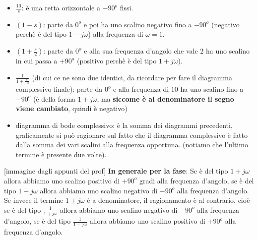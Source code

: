 \begin{itemize}
    \item $\frac{10}{s}$: è una retta orizzontale a $-90^o$ fissi.
    \item $(1-s)$: parte da $0^o$ e poi ha uno scalino negativo fino a $-90^o$ (negativo perchè è del tipo $1-j \omega$) alla frequenza di $\omega=1$.
    \item $(1+\frac{s}{2})$:  parte da $0^o$ e alla sua frequenza d'angolo che vale $2$ ha uno scalino in cui passa a $+ 90^o$ (positivo perchè è del tipo $1+j \omega$).
    \item $\frac{1}{1 + \frac{s}{10}}$ (di cui ce ne sono due identici, da ricordare per fare il diagramma complessivo finale): parte da $0^o$ e alla frequenza di $10$ ha uno scalino fino a $-90^o$ (è della forma $1 + j \omega$, ma \textbf{siccome è al denominatore il segno viene cambiato}, quindi è negativo)
    \item diagramma di bode complessivo: è la somma dei diagrammi precedenti, graficamente si può ragionare sul fatto che il diagramma complessivo è fatto dalla somma dei vari scalini alla frequenza opportuna. (notiamo che l'ultimo termine è presente due volte).
\end{itemize}
[immagine dagli appunti del prof]\newline
\newline
\textbf{In generale per la fase}: Se è del tipo $1+j \omega$ allora abbiamo uno scalino positivo di $+90^o$ gradi alla frequenza d'angolo, se è del tipo $1- j \omega$ allora abbiamo uno scalino negativo di $-90^o$ alla frequenza d'angolo. Se invece il termine $1\pm j \omega$ è a denominatore, il ragionamento è al contrario, cioè se è del tipo $\frac{1}{1+j \omega}$ allora abbiamo uno scalino negativo di $-90^o$ alla frequenza d'angolo, se è del tipo $\frac{1}{1- j \omega}$ allora abbiamo uno scalino positivo di $+90^o$ alla frequenza d'angolo.